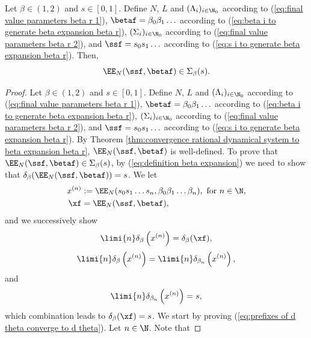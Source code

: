 \begin{theorem}\label{thm:convergence rational dynamical system to beta expansion beta r}
	Let $\beta \in (1,2)$ and $s \in [0,1]$. Define $N$, $L$ and $(\Lambda_i)_{i \in \N_0}$ according to (\ref{eq:final value parameters beta r 1}), $\betaf = \beta_0\beta_1\ldots$ according to (\ref{eq:beta i to generate beta expansion beta r}), $(\Sigma_i)_{i \in \N_0}$ according to (\ref{eq:final value parameters beta r 2}),  and $\ssf = s_0s_1\ldots $ according to (\ref{eq:s i to generate beta expansion beta r}). Then,
	\begin{equation}
		\EE_N(\ssf,\betaf) \in \Sigma_\beta(s).
	\end{equation}
\end{theorem}
\begin{proof}
	Let $\beta \in (1,2)$ and $s \in [0,1]$. Define $N$, $L$ and $(\Lambda_i)_{i \in \N_0}$ according to (\ref{eq:final value parameters beta r 1}), $\betaf = \beta_0\beta_1\ldots$ according to (\ref{eq:beta i to generate beta expansion beta r}), $(\Sigma_i)_{i \in \N_0}$ according to (\ref{eq:final value parameters beta r 2}),  and $\ssf = s_0s_1\ldots $ according to (\ref{eq:s i to generate beta expansion beta r}). By Theorem \ref{thm:convergence rational dynamical system to beta expansion beta r}, $\EE_N(\ssf,\betaf)$ is well-defined. To prove that $\EE_N(\ssf,\betaf) \in \Sigma_\beta(s)$, by (\ref{eq:definition beta expansion}) we need to show that $\delta_\beta(\EE_N(\ssf,\betaf)) = s$. We let 
	\begin{align}
		x^{(n)} &:= \EE_N(s_0s_1\ldots s_n,\beta_0\beta_1\ldots \beta_n), \ \text{for} \ n \in \N,\\
		\xf &= \EE_N(\ssf,\betaf),
	\end{align}
	and we successively show 
	\begin{equation}\label{eq:prefixes of d theta converge to d theta beta r}
		\limi{n} \delta_\beta\left(x^{(n)}\right) = \delta_\beta(\xf),
	\end{equation}
	\begin{equation}\label{eq:delta beta and delta beta n converge}
		\limi{n} \delta_\beta\left(x^{(n)}\right) = \limi{n} \delta_{\beta_n}\left(x^{(n)}\right),
	\end{equation}
	and
	\begin{equation}\label{eq:prefixes of d theta converge to s beta r}
		\limi{n} \delta_{\beta_n}\left(x^{(n)}\right) = s,
	\end{equation}
	which combination leads to $\delta_\beta(\xf) = s$. We start by proving (\ref{eq:prefixes of d theta converge to d theta}). Let $n \in \N$. Note that

\end{proof}
